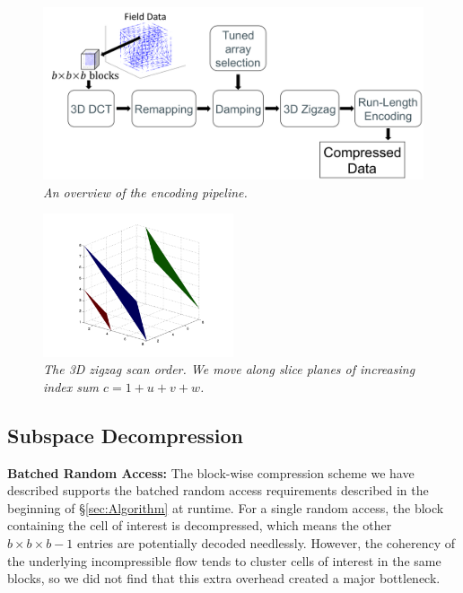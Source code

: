 \begin{figure}
\includegraphics[width=\textwidth]{chap4/figures/compression_flowchart.png}
\caption{\em An overview of the encoding pipeline.}
\label{fig:flowchart}
\end{figure}

\begin{figure}
\centering
\includegraphics[width=0.5\textwidth]{chap4/figures/zigzag3d.png}
\caption{\em The 3D zigzag scan order. We move along slice planes of increasing index sum $c = 1 + u + v + w$.}
\label{fig:zigzag3d}
\end{figure}


\subsection{Subspace Decompression}
\label{sec:decompress}

\noindent \textbf{Batched Random Access:} The block-wise compression scheme we have described supports the batched random access requirements described in the beginning of \S\ref{sec:Algorithm} at runtime. For a single random access, the block containing the cell of interest is decompressed, which means the other $b \times b \times b - 1$ entries are potentially decoded needlessly. However, the coherency of the underlying incompressible flow tends to cluster cells of interest in the same blocks, so we did not find that this extra overhead created a major bottleneck.

